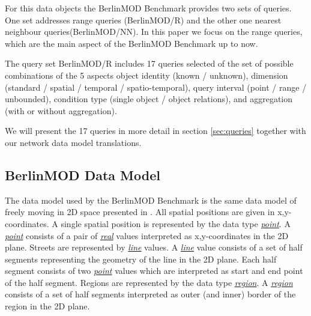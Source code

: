 \documentclass[a4paper]{article}
\newcommand{\bmodb} {BerlinMOD Benchmark}
\newcommand{\dt}[1]{\textsl{\underline{#1}}}
\begin{document}
For this data objects the \bmodb{} provides two sets of queries. One set addresses
range queries (BerlinMOD/R) and the  other one nearest neighbour queries(BerlinMOD/NN).
 In this paper we focus on the range queries, which are the main aspect of the
\bmodb{} up to now.

The query set BerlinMOD/R includes 17 queries selected of the set of possible
combinations of the 5 aspects object identity (known / unknown),
dimension (standard / spatial / temporal / spatio-temporal),
query interval (point / range / unbounded),
condition type (single object / object relations),
and aggregation (with or without aggregation).

We will present the 17 queries in more detail in section \ref{sec:queries}
together with our network data model translations.
\subsection{BerlinMOD Data Model}
\label{sec:bmodbdatamod}
The data model used by the \bmodb{} is the same data model of freely moving in
2D space presented in \cite{594784,335426,352963}. All spatial positions are
given in x,y-coordinates. A single spatial position is represented by the data
type \dt{point}. A \dt{point} consists of a pair of \dt{real} values interpreted
as x,y-coordinates in the 2D plane. Streets are represented by \dt{line} values.
 A \dt{line} value consists of a set of half segments representing the geometry
of the line in the 2D plane. Each half segment consists of two \dt{point} values
which are interpreted as start and end point of the half segment. Regions are
represented by the data type \dt{region}. A \dt{region} consists of a set of
half segments interpreted as outer (and inner) border of the region in the 2D plane.
\end{document}
